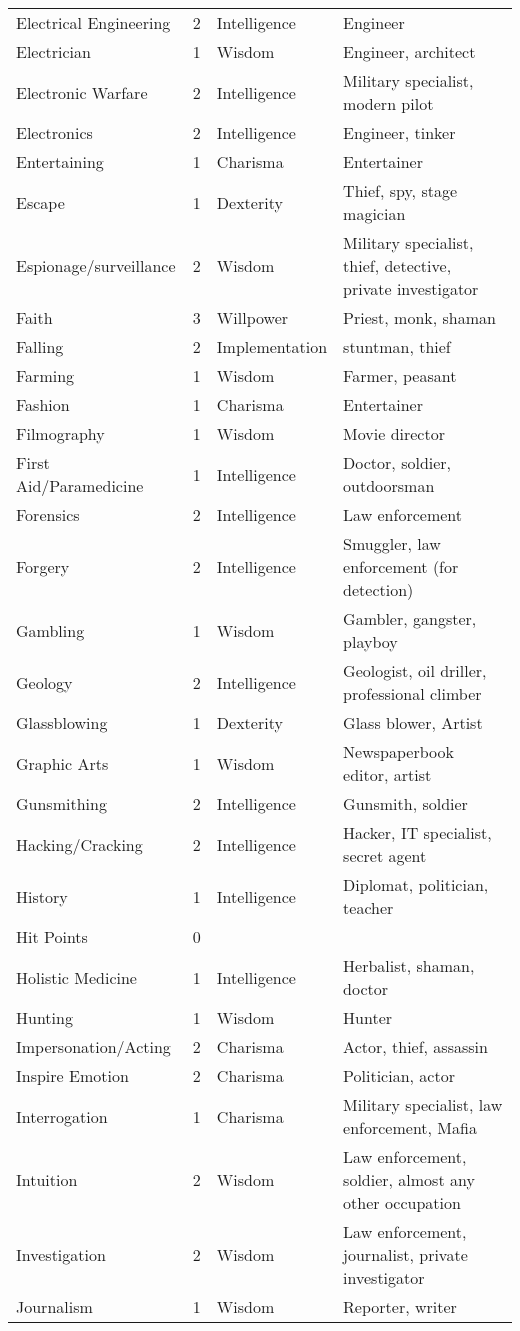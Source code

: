 \documentclass[twoside]{book}
\begin{document}
\begin{longtable}{p{1.25in}llp{12em}}
      \raggedright Electrical Engineering&2&Intelligence&Engineer\tabularnewline
      \raggedright Electrician&1&Wisdom&Engineer, architect\tabularnewline
      \raggedright Electronic Warfare&2&Intelligence&Military specialist, modern pilot\tabularnewline
      \raggedright Electronics&2&Intelligence&Engineer, tinker\tabularnewline
      \raggedright Entertaining&1&Charisma&Entertainer\tabularnewline
      \raggedright Escape&1&Dexterity&Thief, spy, stage magician\tabularnewline
      \raggedright Espionage/surveillance&2&Wisdom&Military specialist, thief, detective, private investigator\tabularnewline
      \raggedright Faith&3&Willpower&Priest, monk, shaman\tabularnewline
      \raggedright Falling&2&Implementation&stuntman, thief\tabularnewline
      \raggedright Farming&1&Wisdom&Farmer, peasant\tabularnewline
      \raggedright Fashion&1&Charisma&Entertainer\tabularnewline
      \raggedright Filmography&1&Wisdom&Movie director\tabularnewline
      \raggedright First Aid/Paramedicine&1&Intelligence&Doctor, soldier, outdoorsman\tabularnewline
      \raggedright Forensics&2&Intelligence&Law enforcement\tabularnewline
      \raggedright Forgery&2&Intelligence&Smuggler, law enforcement (for detection)\tabularnewline
      \raggedright Gambling&1&Wisdom&Gambler, gangster, playboy\tabularnewline
      \raggedright Geology&2&Intelligence&Geologist, oil driller, professional climber\tabularnewline
      \raggedright Glassblowing&1&Dexterity&Glass blower, Artist\tabularnewline
      \raggedright Graphic Arts&1&Wisdom&Newspaperbook editor, artist\tabularnewline
      \raggedright Gunsmithing&2&Intelligence&Gunsmith, soldier\tabularnewline
      \raggedright Hacking/Cracking&2&Intelligence&Hacker, IT specialist, secret agent\tabularnewline
      \raggedright History&1&Intelligence&Diplomat, politician, teacher\tabularnewline
      \raggedright Hit Points&0&\tabularnewline
      \raggedright Holistic Medicine&1&Intelligence&Herbalist, shaman, doctor\tabularnewline
      \raggedright Hunting&1&Wisdom&Hunter\tabularnewline
      \raggedright Impersonation/Acting&2&Charisma&Actor, thief, assassin\tabularnewline
      \raggedright Inspire Emotion&2&Charisma&Politician, actor\tabularnewline
      \raggedright Interrogation&1&Charisma&Military specialist, law enforcement, Mafia\tabularnewline
      \raggedright Intuition&2&Wisdom&Law enforcement, soldier, almost any other occupation\tabularnewline
      \raggedright Investigation&2&Wisdom&Law enforcement, journalist, private investigator\tabularnewline
      \raggedright Journalism&1&Wisdom&Reporter, writer\tabularnewline

\end{longtable}
\end{document}
